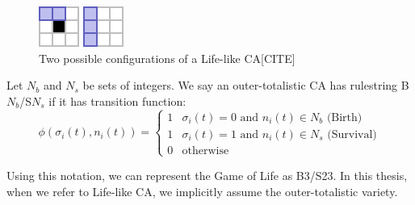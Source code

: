 \begin{figure}[!h]
  \centering
  \begin{minipage}{.4\textwidth}
    \centering
    \includegraphics[width=.4\linewidth]{images/moore_1.png}
  \end{minipage}%
  \begin{minipage}{.4\textwidth}
    \centering
    \includegraphics[width=.4\linewidth]{images/moore_2.png}
  \end{minipage}
  \caption{Two possible configurations of a Life-like CA[CITE]}
  \label{fig:two-moores}
\end{figure}

\begin{definition}
Let $N_b$ and $N_s$ be sets of integers. We say an outer-totalistic CA has rulestring \textnormal{B$N_b$/S$N_s$} if it has transition function:
\[
  \phi(\sigma_i(t), n_i(t)) = 
  \begin{cases}
    1 & \sigma_i(t) = 0 \text{ and } n_i(t) \in N_b \text{  (Birth)}\\
    1 & \sigma_i(t) = 1 \text{ and } n_i(t) \in N_s \text{  (Survival)}\\
    0 & \text{otherwise}
  \end{cases}
\]
\label{def:bs-notation}
\end{definition}

Using this notation, we can represent the Game of Life as B3/S23. In this thesis, when we refer to Life-like CA, we implicitly assume the outer-totalistic variety.

